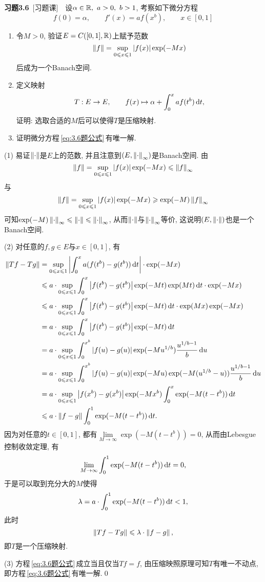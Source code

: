 	\textbf{习题3.6}\ [习题课]\ \ 设$ \alpha\in\mathbb{R},\ a>0,\ b>1 $, 考察如下微分方程
	\begin{equation}\label{eq:3.6题公式}
	f(0)=\alpha,\qquad f'(x)=af(x^b),\qquad x\in[0,1]
	\end{equation}
	\begin{enumerate}[(1)]
	\item 令$ M>0 $, 验证$ E=C([0,1],\mathbb{R}) $上赋予范数
	\[
	\left\| f \right\|=\sup_{0\leqslant x\leqslant 1}\left| f(x) \right| \exp(-Mx)
	\]
	后成为一个Banach空间.
	\item 定义映射
	\[
	T : E\to E,\qquad f(x)\mapsto\alpha+\int_0^x af(t^b)\,\mathrm{d} t,
	\]
	证明: 选取合适的$ M $后可以使得$ T $是压缩映射.
	\item 证明微分方程\,\eqref{eq:3.6题公式}\,有唯一解.
	\end{enumerate}
	\begin{Proof}
	(1) 易证$ \left\| \cdot \right\| $是$ E $上的范数, 并且注意到$ (E,\left\| \cdot \right\|_\infty) $是Banach空间. 由
	\[
	\left\| f \right\|=\sup_{0\leqslant x\leqslant 1}\left| f(x) \right| \exp(-Mx)\leqslant\left\| f \right\|_\infty
	\]
	与
	\[
	\left\| f \right\|=\sup_{0\leqslant x\leqslant 1}\left| f(x) \right| \exp(-Mx)\geqslant\exp(-M)\left\| f \right\|_\infty
	\]
	可知$ \exp(-M)\left\| \cdot \right\|_\infty\leqslant\left\| \cdot \right\|\leqslant\left\| \cdot \right\|_\infty $, 从而$ \left\| \cdot \right\| $与$ \left\| \cdot \right\|_\infty $等价, 这说明$ (E,\left\| \cdot \right\|) $也是一个Banach空间.
	
	(2) 对任意的$ f, g\in E $与$ x\in[0,1] $, 有
	\[
	\begin{aligned}
	\left\| Tf-Tg \right\| & =\sup_{0\leqslant x\leqslant 1}\left| \int_0^xa(f(t^b)-g(t^b))\,\mathrm{d} t \right| \cdot\exp(-Mx) \\
	& \leqslant a\cdot\sup_{0\leqslant x\leqslant 1}\int_0^x\left| f(t^b)-g(t^b) \right| \exp(-Mt)\exp(Mt)\,\mathrm{d} t\cdot\exp(-Mx) \\
	& \leqslant a\cdot\sup_{0\leqslant x\leqslant 1}\int_0^x\left| f(t^b)-g(t^b) \right| \exp(-Mt)\,\mathrm{d} t\cdot\exp(Mx)\exp(-Mx) \\
	& =a\cdot\sup_{0\leqslant x\leqslant 1}\int_0^x\left| f(t^b)-g(t^b) \right| \exp(-Mt)\,\mathrm{d} t\\
	& =a\cdot\sup_{0\leqslant x\leqslant 1}\int_0^{x^b}\left| f(u)-g(u) \right| \exp(-Mu^{1/b})\frac{u^{1/b-1}}{b}\,\mathrm{d} u\\
	& =a\cdot\sup_{0\leqslant x\leqslant 1}\int_0^{x^b}\left| f(u)-g(u) \right| \exp(-Mu)\exp(-M(u^{1/b}-u))\frac{u^{1/b-1}}{b}\,\mathrm{d} u\\
	& =a\cdot\sup_{0\leqslant x\leqslant 1}\left| f(x^b)-g(x^b) \right| \exp(-Mx^b)\int_0^x\exp(-M(t-t^b))\,\mathrm{d} t\\
	& \leqslant a\cdot\left\| f-g \right\|\int_0^1\exp(-M(t-t^b))\,\mathrm{d} t.
	\end{aligned}
	\]
	因为对任意的$ t\in[0,1] $, 都有$ \lim\limits_{M\to\infty}\exp(-M(t-t^b))=0 $, 从而由Lebesgue控制收敛定理, 有
	\[
	\lim_{M\to\infty}\int_0^1\exp(-M(t-t^b))\,\mathrm{d} t=0,
	\]
	于是可以取到充分大的$ M $使得
	\[
	\lambda=a\cdot\int_0^1\exp(-M(t-t^b))\,\mathrm{d} t<1,
	\]
	此时
	\[
	\left\| Tf-Tg \right\|\leqslant\lambda\cdot\left\| f-g \right\|,
	\]
	即$ T $是一个压缩映射.
	
	(3) 方程\,\eqref{eq:3.6题公式}\,成立当且仅当$ Tf=f $, 由压缩映照原理可知$ T $有唯一不动点, 即方程\,\eqref{eq:3.6题公式}\,有唯一解.\qed
	\end{Proof}
	

